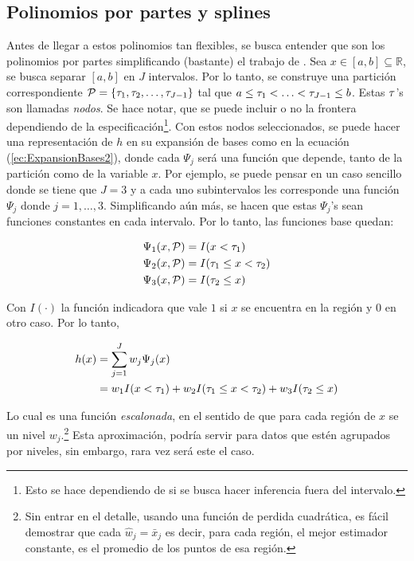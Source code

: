 \documentclass[../Main/Main.tex]{subfiles}
\begin{document}
\subsection{Polinomios por partes y splines} \label{sec:PolisYSplines}
Antes de llegar a estos polinomios tan flexibles, se busca entender que son los polinomios por partes simplificando (bastante) el trabajo de \autocite{wahba1990splines}. Sea $x\in[a,b]\subseteq\mathbb{R}$, se busca separar $[a,b]$ en $J$ intervalos. Por lo tanto, se construye una partición correspondiente $\mathcal{P} = \left\{\tau_1,  \tau_2,\ldots,  \tau_{J-1} \right\}$ tal que $a \leq  \tau_1 < \ldots <  \tau_{J-1} \leq b$. Estas $ \tau$'s son llamadas \textit{nodos}. Se hace notar, que se puede incluir o no la frontera dependiendo de la especificación\footnote{Esto se hace dependiendo de si se busca hacer inferencia fuera del intervalo.}. Con estos nodos seleccionados, se puede hacer una representación de $h$ en su expansión de bases como en la ecuación (\ref{ec:ExpansionBases2}), donde cada $\Psi_j$ será una función que depende, tanto de la partición como de la variable $x$. Por ejemplo, se puede pensar en un caso sencillo donde se tiene que $J = 3$ y a cada uno subintervalos les corresponde una función $\Psi_j$ donde $j = 1,\ldots,3$. Simplificando aún más, se hacen que estas $\Psi_j$'s sean funciones constantes en cada intervalo. Por lo tanto, las funciones base quedan:

\begin{align*}
	\Psi_1(x,\mathcal{P}) &= I( x <  \tau_1) \\
	\Psi_2(x,\mathcal{P}) &= I( \tau_1 \leq x <  \tau_2) \\
	\Psi_3(x,\mathcal{P}) &= I( \tau_2 \leq x ) 
\end{align*}

Con $I(\cdot)$ la función indicadora que vale $1$ si $x$ se encuentra en la región y $0$ en otro caso. Por lo tanto, 

\begin{align*}
		h(x) &= \sum_{j = 1}^J w_j\Psi_j(x) \\
			 &= w_1 I( x <  \tau_1) + w_2 I( \tau_1 \leq x <  \tau_2) + w_3 I( \tau_2 \leq x)
\end{align*}

Lo cual es una función \textit{escalonada}, en el sentido de que para cada región de $x$ se un nivel $w_j$.\footnote{Sin entrar en el detalle, usando una función de perdida cuadrática, es fácil demostrar que cada $\hat{w}_j = \bar{x}_j$ es decir, para cada región, el mejor estimador constante, es el promedio de los puntos de esa región.} Esta aproximación, podría servir para datos que estén agrupados por niveles, sin embargo, rara vez será este el caso.\\
\end{document}
